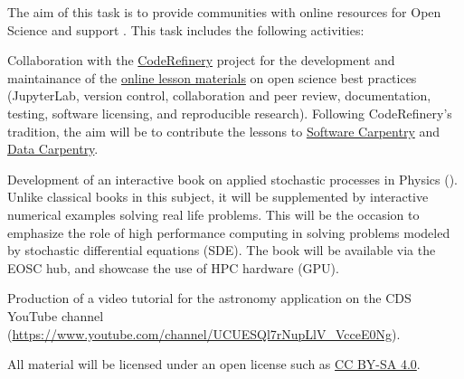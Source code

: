 \begin{task}[
  title=Online resources for open science,
  id=online-resources,
  lead=UIO,
  PM=14,
  wphases={0-36!.3},
  partners={SRL,MP,UIO}
]
  The aim of this task is to provide communities with online resources for Open Science and support .
  This task includes the following activities:
  \begin{compactitem}
  \item Collaboration with the \href{https://coderefinery.org}{CodeRefinery} project for the development and maintainance of the \href{https://coderefinery.org/lessons/}{online lesson materials} on open science best practices (JupyterLab, version control, collaboration and peer review, documentation, testing, software licensing, and reproducible research).
    Following CodeRefinery's tradition, the aim will be to contribute the
    lessons to \href{https://software-carpentry.org/}{Software Carpentry}
    and \href{https://data-carpentry.org/}{Data Carpentry}.
\item Development of an interactive book on applied stochastic
  processes in Physics (). Unlike classical
  books in this subject, it will be supplemented by interactive
  numerical examples solving real life problems. This will be the
  occasion to emphasize the role of high performance computing in
  solving problems modeled by stochastic differential equations (SDE).
  The book will be available via the EOSC hub, and showcase the use of
  HPC hardware (GPU).
  \item Production of a video tutorial for the astronomy application on the 
      CDS YouTube channel (\url{https://www.youtube.com/channel/UCUESQl7rNupLlV_VcceE0Ng}).
  \end{compactitem}
  All material will be licensed under an open license such as
  \href{https://creativecommons.org/licenses/by-sa/4.0/}{CC BY-SA 4.0}.
\end{task}
